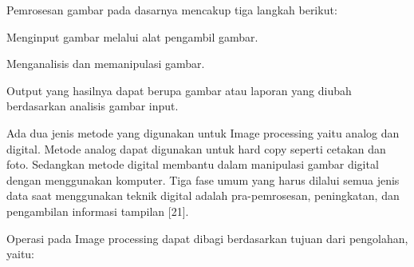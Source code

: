 Pemrosesan gambar pada dasarnya mencakup tiga langkah berikut:

\begin{packed_item}
	\item Menginput gambar melalui alat pengambil gambar.
	\item Menganalisis dan memanipulasi gambar.
	\item Output yang hasilnya dapat berupa gambar atau laporan yang diubah berdasarkan analisis gambar input.
\end{packed_item}

Ada dua jenis metode yang digunakan untuk Image processing yaitu analog dan digital. Metode analog dapat digunakan untuk hard copy seperti cetakan dan foto. Sedangkan metode digital membantu dalam manipulasi gambar digital dengan menggunakan komputer. Tiga fase umum yang harus dilalui semua jenis data saat menggunakan teknik digital adalah pra-pemrosesan, peningkatan, dan pengambilan informasi tampilan [21].

Operasi pada Image processing dapat dibagi berdasarkan tujuan dari pengolahan, yaitu:

